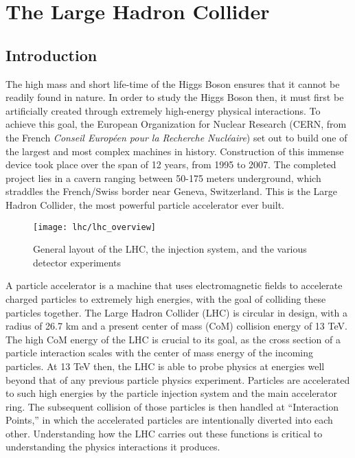 \chapter{The Large Hadron Collider}\label{chapter:lhc}

\section{Introduction}
    The high mass and short life-time of the Higgs Boson ensures that it cannot be readily found in nature.
    In order to study the Higgs Boson then, it must first be artificially created through extremely high-energy physical interactions.
    To achieve this goal, the European Organization for Nuclear Research
        (CERN, from the French \textit{Conseil Européen pour la Recherche Nucléaire})
        set out to build one of the largest and most complex machines in history.
    Construction of this immense device took place over the span of 12 years, from 1995 to 2007.
    The completed project lies in a cavern ranging between 50-175 meters underground, which straddles the French/Swiss border near Geneva, Switzerland.
    This is the Large Hadron Collider, the most powerful particle accelerator ever built.

    \begin{figure}[h]
        \texttt{[image: lhc/lhc\_overview]}
        \caption{General layout of the LHC, the injection system, and the various detector experiments \cite{lhc_run2}}
        \label{fig:lhc_overview}
    \end{figure}

    A particle accelerator is a machine that uses electromagnetic fields to accelerate charged particles to extremely high energies, with the goal of colliding these particles together.
    The Large Hadron Collider (LHC) is circular in design, with a radius of 26.7 km and a present center of mass (CoM) collision energy of 13 TeV.
    The high CoM energy of the LHC is crucial to its goal, as the cross section of a particle interaction scales with the center of mass energy of the incoming particles.
    At 13 TeV then, the LHC is able to probe physics at energies well beyond that of any previous particle physics experiment.
    Particles are accelerated to such high energies by the particle injection system and the main accelerator ring.
    The subsequent collision of those particles is then handled at ``Interaction Points,'' in which the accelerated particles are intentionally diverted into each other.
    Understanding how the LHC carries out these functions is critical to understanding the physics interactions it produces.


